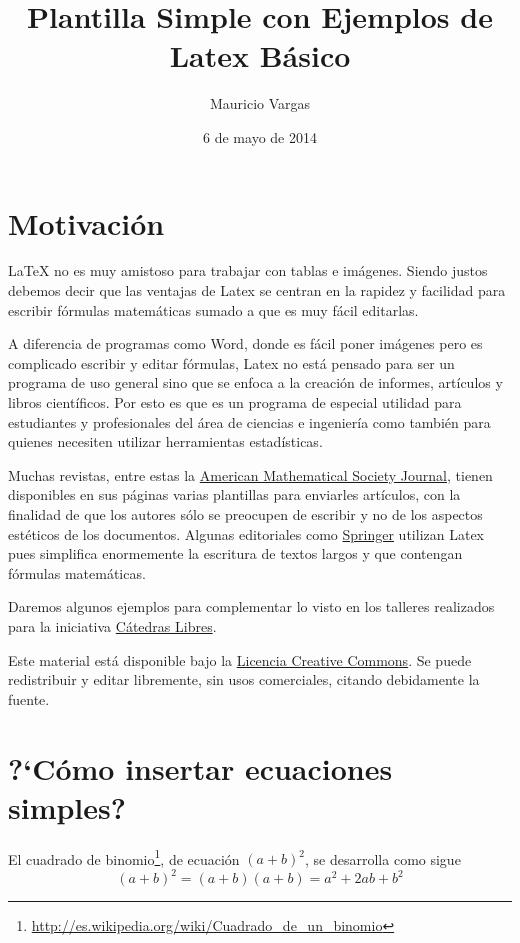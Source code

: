 \documentclass[letterpaper,twoside]{article}
\title{Plantilla Simple con Ejemplos de Latex B\'asico}
\author{Mauricio Vargas}
\date{6 de mayo de 2014}
\begin{document}
\maketitle
\tableofcontents

\section{Motivaci\'on}

\LaTeX\: no es muy amistoso para trabajar con tablas e im\'agenes. Siendo justos debemos decir que las ventajas de Latex se centran en la rapidez y facilidad para escribir f\'ormulas matem\'aticas sumado a que es muy f\'acil editarlas. 

A diferencia de programas como Word, donde es f\'acil poner im\'agenes pero es complicado escribir y editar f\'ormulas, Latex no est\'a pensado para ser un programa de uso general sino que se enfoca a la creaci\'on de informes, art\'iculos y libros cient\'ificos. Por esto es que es un programa de especial utilidad para estudiantes y profesionales del \'area de ciencias e ingenier\'ia como tambi\'en para quienes necesiten utilizar herramientas estad\'isticas.

Muchas revistas, entre estas la \href{http://www.ams.org/home/page}{American Mathematical Society Journal}, tienen disponibles en sus p\'aginas varias plantillas para enviarles art\'iculos, con la finalidad de que los autores s\'olo se preocupen de escribir y no de los aspectos est\'eticos de los documentos. Algunas editoriales como \href{http://www.ams.org/home/page}{Springer} utilizan Latex pues simplifica enormemente la escritura de textos largos y que contengan f\'ormulas matem\'aticas.

Daremos algunos ejemplos para complementar lo visto en los talleres realizados para la iniciativa \href{https://www.facebook.com/catedraslibres?fref=ts}{C\'atedras Libres}.

Este material est\'a disponible bajo la \href{http://creativecommons.org/licenses/by-nc/3.0/}{Licencia Creative Commons}. Se puede redistribuir y editar libremente, sin usos comerciales, citando debidamente la fuente.

\newpage

\section{?`C\'omo insertar ecuaciones simples?}

El cuadrado de binomio\footnote{\quad \url{http://es.wikipedia.org/wiki/Cuadrado_de_un_binomio}}, de ecuaci\'on $(a+b)^2$, se desarrolla como sigue 
$$(a+b)^2 = (a+b)(a+b) = a^2 + 2ab + b^2$$
\end{document}
